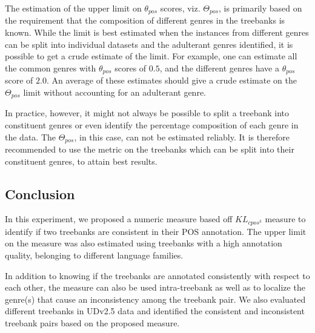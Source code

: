The estimation of the upper limit on $\theta_{pos}$ scores, viz. $\Theta_{pos}$, is primarily based on the requirement that the composition of different genres in the treebanks is known. While the limit is best estimated when the instances from different genres can be split into individual datasets and the adulterant genres identified, it is possible to get a crude estimate of the limit. For example, one can estimate all the common genres with $\theta_{pos}$ scores of $0.5$, and the different genres have a $\theta_{pos}$ score of $2.0$. An average of these estimates should give a crude estimate on the $\Theta_{pos}$ limit without accounting for an adulterant genre.

In practice, however, it might not always be possible to split a treebank into constituent genres or even identify the percentage composition of each genre in the data. The $\Theta_{pos}$, in this case, can not be estimated reliably. It is therefore recommended to use the metric on the treebanks which can be split into their constituent genres, to attain best results.

\subsection{Conclusion}

In this experiment, we proposed a numeric measure based off $KL_{cpos^{3}}$ measure \citep{klcpos3} to identify if two treebanks are consistent in their POS annotation. The upper limit on the measure was also estimated using treebanks with a high annotation quality, belonging to different language families.

In addition to knowing if the treebanks are annotated consistently with respect to each other, the measure can also be used intra-treebank as well as to localize the genre(s) that cause an inconsistency among the treebank pair. We also evaluated different treebanks in UDv2.5 data \citep{UDv2.5} and identified the consistent and inconsistent treebank pairs based on the proposed measure.